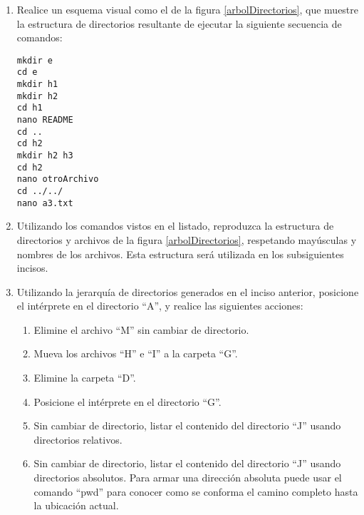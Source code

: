 \documentclass[12pt]{article}
\begin{document}
\begin{enumerate}
\begin{center}
\end{center}

    \item Realice un esquema visual como el de la figura
        \ref{arbolDirectorios}, que muestre la estructura de directorios
        resultante de ejecutar la siguiente secuencia de comandos:

        \begin{verbatim}
mkdir e
cd e
mkdir h1
mkdir h2
cd h1
nano README
cd ..
cd h2
mkdir h2 h3
cd h2
nano otroArchivo
cd ../../
nano a3.txt
        \end{verbatim}

    \item Utilizando los comandos vistos en el listado, reproduzca la
        estructura de directorios y archivos de la figura
        \ref{arbolDirectorios}, respetando mayúsculas y nombres de los
        archivos. Esta estructura será utilizada en los subsiguientes incisos.

    \item Utilizando la jerarquía de directorios generados en el inciso
        anterior, posicione el intérprete en el directorio ``A'', y realice
        las siguientes acciones:

    \begin{enumerate}

        \item Elimine el archivo ``M'' sin cambiar de directorio.

        \item Mueva los archivos ``H'' e ``I'' a la carpeta ``G''.

        \item Elimine la carpeta ``D''.

        \item Posicione el intérprete en el directorio ``G''.

        \item Sin cambiar de directorio, listar el contenido del directorio
            ``J'' usando directorios relativos.

        \item Sin cambiar de directorio, listar el contenido del directorio
            ``J'' usando directorios absolutos. Para armar una dirección
            absoluta puede usar el comando ``pwd'' para conocer como se
            conforma el camino completo hasta la ubicación actual.

    \end{enumerate}


\end{enumerate}
\end{document}
